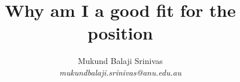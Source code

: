 \documentclass{article}
\title{Why am I a good fit for the position}
\author{Mukund Balaji Srinivas\\\textit{mukundbalaji.srinivas@anu.edu.au}}
\begin{document}
\maketitle

\sectionfont{\small}
\subsectionfont{\small}

\end{document}
